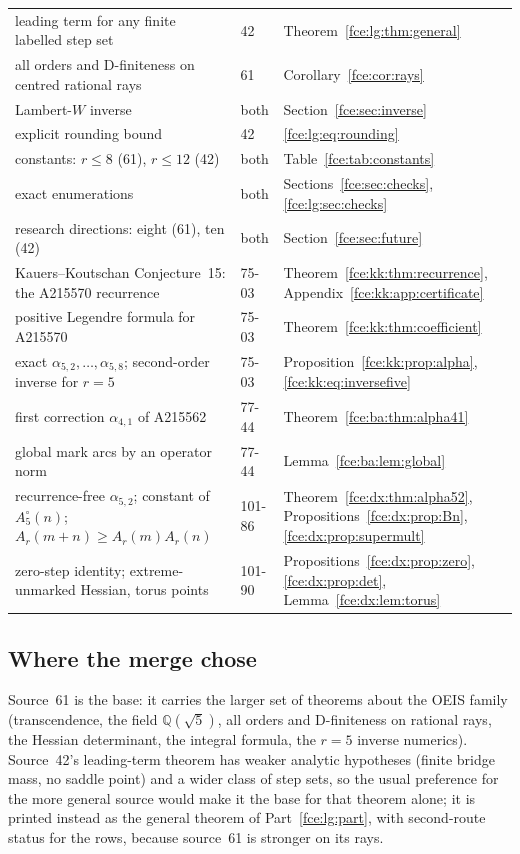 \documentclass[11pt,a4paper]{article}
\numberwithin{equation}{section}
\theoremstyle{definition}\newtheorem{definition}[theorem]{Definition}
\theoremstyle{remark}\newtheorem{remark}[theorem]{Remark}
\newcommand{\Q}{\mathbb Q}
\begin{document}
\begin{table}[!ht]
\begin{tabular}{@{}>{\raggedright\arraybackslash}p{}l>{\raggedright\arraybackslash}p{}@{}}
leading term for any finite labelled step set & 42 & Theorem~\ref{fce:lg:thm:general}\\
all orders and D-finiteness on centred rational rays & 61 & Corollary~\ref{fce:cor:rays}\\
Lambert-$W$ inverse & both & Section~\ref{fce:sec:inverse}\\
explicit rounding bound & 42 & \eqref{fce:lg:eq:rounding}\\
constants: $r\le8$ (61), $r\le12$ (42) & both & Table~\ref{fce:tab:constants}\\
exact enumerations & both & Sections~\ref{fce:sec:checks}, \ref{fce:lg:sec:checks}\\
research directions: eight (61), ten (42) & both & Section~\ref{fce:sec:future}\\
\midrule
Kauers--Koutschan Conjecture~15: the A215570 recurrence & 75-03 &
 Theorem~\ref{fce:kk:thm:recurrence}, Appendix~\ref{fce:kk:app:certificate}\\
positive Legendre formula for A215570 & 75-03 & Theorem~\ref{fce:kk:thm:coefficient}\\
exact $\alpha_{5,2},\ldots,\alpha_{5,8}$; second-order inverse for $r=5$ & 75-03 &
 Proposition~\ref{fce:kk:prop:alpha}, \eqref{fce:kk:eq:inversefive}\\
\midrule
first correction $\alpha_{4,1}$ of A215562 & 77-44 & Theorem~\ref{fce:ba:thm:alpha41}\\
global mark arcs by an operator norm & 77-44 & Lemma~\ref{fce:ba:lem:global}\\
\midrule
recurrence-free $\alpha_{5,2}$; constant of $A^\circ_5(n)$; $A_r(m+n)\ge A_r(m)A_r(n)$ & 101-86 &
 Theorem~\ref{fce:dx:thm:alpha52}, Propositions~\ref{fce:dx:prop:Bn}, \ref{fce:dx:prop:supermult}\\
zero-step identity; extreme-unmarked Hessian, torus points & 101-90 &
 Propositions~\ref{fce:dx:prop:zero}, \ref{fce:dx:prop:det}, Lemma~\ref{fce:dx:lem:torus}\\
\bottomrule
\end{tabular}
\end{table}

\subsection{Where the merge chose}\label{fce:sec:choices}
Source~61 is the base: it carries the larger set of theorems about the
OEIS family (transcendence, the field $\Q(\sqrt5)$, all orders and
D-finiteness on rational rays, the Hessian determinant, the integral
formula, the $r=5$ inverse numerics). Source~42's leading-term theorem has
weaker analytic hypotheses (finite bridge mass, no saddle point) and a
wider class of step sets, so the usual preference for the more general
source would make it the base for that theorem alone; it is printed instead
as the general theorem of Part~\ref{fce:lg:part}, with second-route status
for the rows, because source~61 is stronger on its rays.
\end{document}
